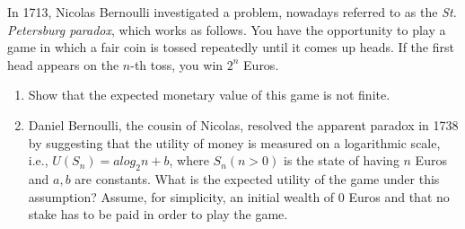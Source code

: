 In 1713, Nicolas Bernoulli investigated a problem, nowadays referred to as the \textit{St. Petersburg paradox}, which works as follows. You have the opportunity to play a game in which a fair coin is tossed repeatedly until it comes up heads. If the first head appears on the $n$-th toss, you win $2^n$ Euros.

\begin{enumerate}[label=(\alph*)]
    \item Show that the expected monetary value of this game is not finite.
    \item Daniel Bernoulli, the cousin of Nicolas, resolved the apparent paradox in 1738 by suggesting that the utility of money is measured on a logarithmic scale, i.e., $U(S_n) = alog_2 n + b$, where $S_n (n > 0)$ is the state of having $n$ Euros and $a,b$ are constants. What is the expected utility of the game under this assumption? Assume, for simplicity, an initial wealth of $0$ Euros and that no stake has to be paid in order to play the game.
\end{enumerate}